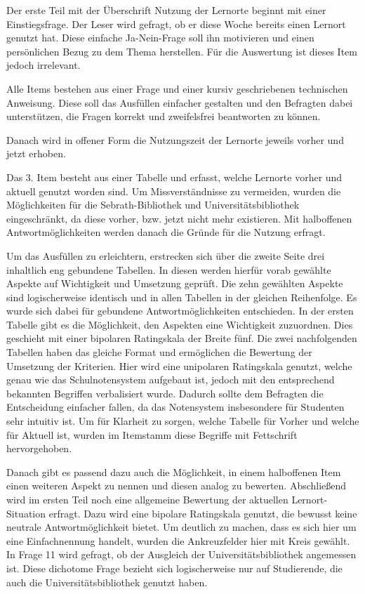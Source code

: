 \documentclass[11pt, a4paper]{article}
\begin{document}
Der erste Teil mit der Überschrift Nutzung der Lernorte beginnt mit einer Einstiegsfrage.
Der Leser wird gefragt, ob er diese Woche bereits einen Lernort genutzt hat. Diese einfache Ja-Nein-Frage soll ihn motivieren und einen persönlichen Bezug zu dem Thema herstellen. Für die Auswertung ist dieses Item jedoch irrelevant.

Alle Items bestehen aus einer Frage und einer kursiv geschriebenen technischen Anweisung. Diese soll das Ausfüllen einfacher gestalten und den Befragten dabei unterstützen, die Fragen korrekt und zweifelsfrei beantworten zu können.

Danach wird in offener Form die Nutzungszeit der Lernorte jeweils vorher und jetzt erhoben. 

Das 3. Item besteht aus einer Tabelle und erfasst, welche Lernorte vorher und aktuell genutzt worden sind.
Um Missverständnisse zu vermeiden, wurden die Möglichkeiten für die Sebrath-Bibliothek und Universitätsbibliothek eingeschränkt, da diese vorher, bzw. jetzt nicht mehr existieren.
Mit halboffenen Antwortmöglichkeiten werden danach die Gründe für die Nutzung erfragt.

Um das Ausfüllen zu erleichtern, erstrecken sich über die zweite Seite drei inhaltlich eng gebundene Tabellen. In diesen werden hierfür vorab gewählte Aspekte auf Wichtigkeit und Umsetzung geprüft. Die zehn gewählten Aspekte sind logischerweise identisch und in allen Tabellen in der gleichen Reihenfolge.
Es wurde sich dabei für gebundene Antwortmöglichkeiten entschieden.
In der ersten Tabelle gibt es die Möglichkeit, den Aspekten eine Wichtigkeit zuzuordnen. Dies geschieht mit einer bipolaren Ratingskala der Breite fünf.
Die zwei nachfolgenden Tabellen haben das gleiche Format und ermöglichen die Bewertung der Umsetzung der Kriterien. Hier wird eine unipolaren Ratingskala genutzt, welche genau wie das Schulnotensystem aufgebaut ist, jedoch 
mit den entsprechend bekannten Begriffen verbalisiert wurde.
Dadurch sollte dem Befragten die Entscheidung einfacher fallen, da das Notensystem insbesondere für Studenten sehr intuitiv ist.
Um für Klarheit zu sorgen, welche Tabelle für Vorher und welche für Aktuell ist, wurden im Itemstamm diese Begriffe mit Fettschrift hervorgehoben.

Danach gibt es passend dazu auch die Möglichkeit, in einem halboffenen Item einen weiteren Aspekt zu nennen und diesen analog zu bewerten.
Abschließend wird im ersten Teil noch eine allgemeine Bewertung der aktuellen Lernort-Situation erfragt.
Dazu wird eine bipolare Ratingskala genutzt, die bewusst keine neutrale Antwortmöglichkeit bietet.
Um deutlich zu machen, dass es sich hier um eine Einfachnennung handelt, wurden die Ankreuzfelder hier mit Kreis gewählt.
In Frage 11 wird gefragt, ob der Ausgleich der Universitätsbibliothek angemessen ist. Diese dichotome Frage bezieht sich logischerweise nur auf Studierende, die auch die Universitätsbibliothek genutzt haben. 
\end{document}
